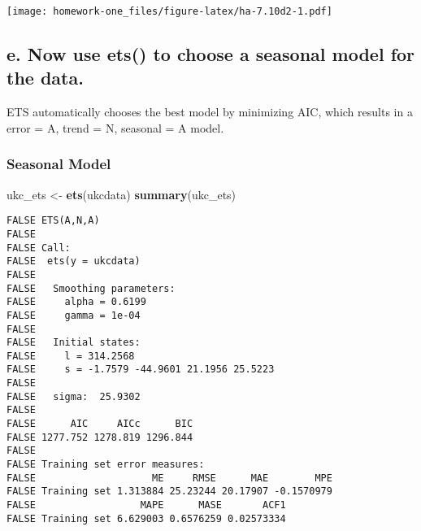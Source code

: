 \documentclass[openany]{book}
\newenvironment{Shaded}{\begin{snugshade}}{\end{snugshade}}
\newcommand{\DataTypeTok}[1]{\textcolor[rgb]{0.13,0.29,0.53}{#1}}
\newcommand{\FloatTok}[1]{\textcolor[rgb]{0.00,0.00,0.81}{#1}}
\newcommand{\KeywordTok}[1]{\textcolor[rgb]{0.13,0.29,0.53}{\textbf{#1}}}
\newcommand{\NormalTok}[1]{#1}
\newcommand{\OperatorTok}[1]{\textcolor[rgb]{0.81,0.36,0.00}{\textbf{#1}}}
\newcommand{\StringTok}[1]{\textcolor[rgb]{0.31,0.60,0.02}{#1}}
\begin{document}
\begin{Shaded}
\end{Shaded}

\texttt{[image: homework-one\_files/figure-latex/ha-7.10d2-1.pdf]}

\hypertarget{e.-now-use-ets-to-choose-a-seasonal-model-for-the-data.}{%
\subsection{e. Now use ets() to choose a seasonal model for the data.}\label{e.-now-use-ets-to-choose-a-seasonal-model-for-the-data.}}

ETS automatically chooses the best model by minimizing AIC, which results in a error = A, trend = N, seasonal = A model.

\hypertarget{seasonal-model}{%
\subsubsection{Seasonal Model}\label{seasonal-model}}

\begin{Shaded}
\begin{Highlighting}[]
\NormalTok{ukc_ets <-}\StringTok{ }\KeywordTok{ets}\NormalTok{(ukcdata)}
\KeywordTok{summary}\NormalTok{(ukc_ets)}
\end{Highlighting}
\end{Shaded}

\begin{verbatim}
FALSE ETS(A,N,A) 
FALSE 
FALSE Call:
FALSE  ets(y = ukcdata) 
FALSE 
FALSE   Smoothing parameters:
FALSE     alpha = 0.6199 
FALSE     gamma = 1e-04 
FALSE 
FALSE   Initial states:
FALSE     l = 314.2568 
FALSE     s = -1.7579 -44.9601 21.1956 25.5223
FALSE 
FALSE   sigma:  25.9302
FALSE 
FALSE      AIC     AICc      BIC 
FALSE 1277.752 1278.819 1296.844 
FALSE 
FALSE Training set error measures:
FALSE                    ME     RMSE      MAE        MPE
FALSE Training set 1.313884 25.23244 20.17907 -0.1570979
FALSE                  MAPE      MASE       ACF1
FALSE Training set 6.629003 0.6576259 0.02573334
\end{verbatim}
\end{document}
